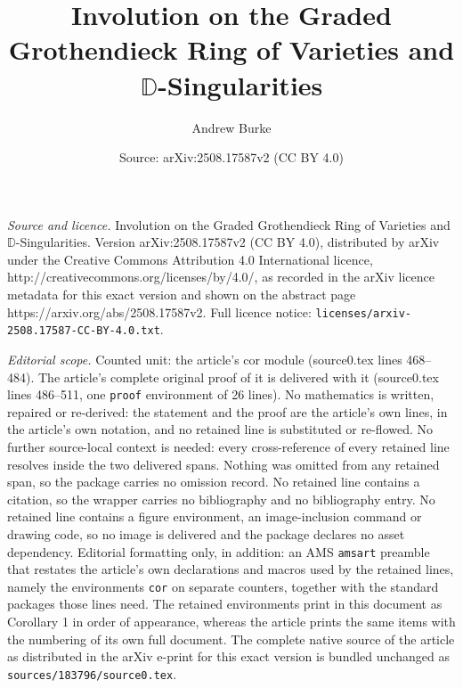 \documentclass[10pt,a4paper]{amsart}
\title{Involution on the Graded Grothendieck Ring of Varieties and $\mathbb{D}$-Singularities}
\author{Andrew Burke}
\date{Source: arXiv:2508.17587v2 (CC BY 4.0)}
\begin{document}
\maketitle

\noindent\emph{Source and licence.} Involution on the Graded Grothendieck Ring of Varieties and $\mathbb{D}$-Singularities. Version arXiv:2508.17587v2 (CC BY 4.0), distributed by arXiv under the Creative Commons Attribution 4.0 International licence, http://creativecommons.org/licenses/by/4.0/, as recorded in the arXiv licence metadata for this exact version and shown on the abstract page https://arxiv.org/abs/2508.17587v2. Full licence notice: \texttt{licenses/arxiv-2508.17587-CC-BY-4.0.txt}.\par\smallskip

\noindent\textit{Editorial scope.} Counted unit: the article's cor module (source0.tex lines 468--484). The article's complete original proof of it is delivered with it (source0.tex lines 486--511, one \texttt{proof} environment of 26 lines). No mathematics is written, repaired or re-derived: the statement and the proof are the article's own lines, in the article's own notation, and no retained line is substituted or re-flowed.  No further source-local context is needed: every cross-reference of every retained line resolves inside the two delivered spans.  Nothing was omitted from any retained span, so the package carries no omission record.  No retained line contains a citation, so the wrapper carries no bibliography and no bibliography entry.  No retained line contains a figure environment, an image-inclusion command or drawing code, so no image is delivered and the package declares no asset dependency.  Editorial formatting only, in addition: an AMS \texttt{amsart} preamble that restates the article's own declarations and macros used by the retained lines, namely the environments \texttt{cor} on separate counters, together with the standard packages those lines need.  The retained environments print in this document as Corollary 1 in order of appearance, whereas the article prints the same items with the numbering of its own full document.  The complete native source of the article as distributed in the arXiv e-print for this exact version is bundled unchanged as \texttt{sources/183796/source0.tex}.
\end{document}
